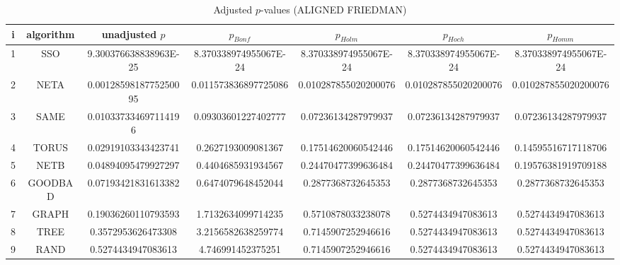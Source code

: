 \documentclass[a4paper,10pt]{article}
\begin{document}
\begin{landscape}
\begin{table}[!htp]
\centering\scriptsize
\caption{Adjusted $p$-values (ALIGNED FRIEDMAN)}
\begin{tabular}{ccccccc}
i&algorithm&unadjusted $p$&$p_{Bonf}$&$p_{Holm}$&$p_{Hoch}$&$p_{Homm}$\\
\hline
1& SSO&9.300376638838963E-25&8.370338974955067E-24&8.370338974955067E-24&8.370338974955067E-24&8.370338974955067E-24\\
2& NETA&0.0012859818775250095&0.011573836897725086&0.010287855020200076&0.010287855020200076&0.010287855020200076\\
3& SAME&0.010337334697114196&0.09303601227402777&0.07236134287979937&0.07236134287979937&0.07236134287979937\\
4& TORUS&0.02919103343423741&0.2627193009081367&0.17514620060542446&0.17514620060542446&0.14595516717118706\\
5& NETB&0.04894095479927297&0.4404685931934567&0.24470477399636484&0.24470477399636484&0.19576381919709188\\
6& GOODBAD&0.07193421831613382&0.6474079648452044&0.2877368732645353&0.2877368732645353&0.2877368732645353\\
7& GRAPH&0.19036260110793593&1.7132634099714235&0.5710878033238078&0.5274434947083613&0.5274434947083613\\
8& TREE&0.3572953626473308&3.2156582638259774&0.7145907252946616&0.5274434947083613&0.5274434947083613\\
9& RAND&0.5274434947083613&4.746991452375251&0.7145907252946616&0.5274434947083613&0.5274434947083613\\
\hline
\end{tabular}
\end{table}


\end{landscape}
\end{document}
